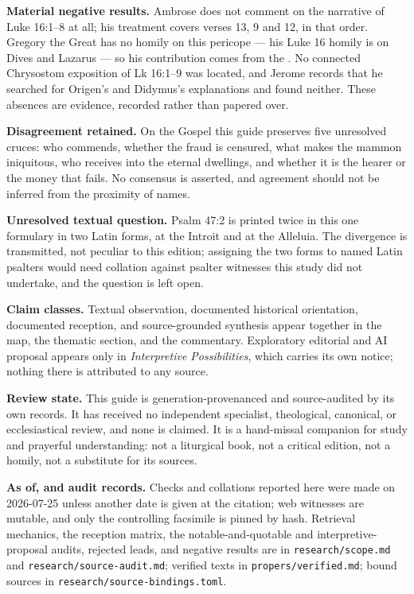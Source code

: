 \textbf{Material negative results.} Ambrose does not comment on the narrative of
Luke 16:1--8 at all; his treatment covers verses 13, 9 and 12, in that order.
Gregory the Great has no homily on this pericope --- his Luke 16 homily is on
Dives and Lazarus --- so his contribution comes from the . No
connected Chrysostom exposition of Lk 16:1--9 was located, and Jerome records
that he searched for Origen's and Didymus's explanations and found neither.
These absences are evidence, recorded rather than papered over.

\textbf{Disagreement retained.} On the Gospel this guide preserves five
unresolved cruces: who commends, whether the fraud is censured, what makes the
mammon iniquitous, who receives into the eternal dwellings, and whether it is the
hearer or the money that fails. No consensus is asserted, and agreement should
not be inferred from the proximity of names.

\textbf{Unresolved textual question.} Psalm 47:2 is printed twice in this one
formulary in two Latin forms,  at the Introit and
 at the Alleluia. The divergence is transmitted, not
peculiar to this edition; assigning the two forms to named Latin psalters would
need collation against psalter witnesses this study did not undertake, and the
question is left open.

\textbf{Claim classes.} Textual observation, documented historical orientation,
documented reception, and source-grounded synthesis appear together in the map,
the thematic section, and the commentary. Exploratory editorial and AI proposal
appears only in \emph{Interpretive Possibilities}, which carries its own notice;
nothing there is attributed to any source.

\textbf{Review state.} This guide is generation-provenanced and source-audited
by its own records. It has received no independent specialist, theological,
canonical, or ecclesiastical review, and none is claimed. It is a hand-missal
companion for study and prayerful understanding: not a liturgical book, not a
critical edition, not a homily, not a substitute for its sources.

\textbf{As of, and audit records.} Checks and collations reported here were made
on 2026-07-25 unless another date is given at the citation; web witnesses are
mutable, and only the controlling facsimile is pinned by hash. Retrieval
mechanics, the reception matrix, the notable-and-quotable and
interpretive-proposal audits, rejected leads, and negative results are in
\texttt{research/scope.md} and \texttt{research/source-audit.md}; verified texts
in \texttt{propers/verified.md}; bound sources in
\texttt{research/source-bindings.toml}.

\endgroup

\clearpage
